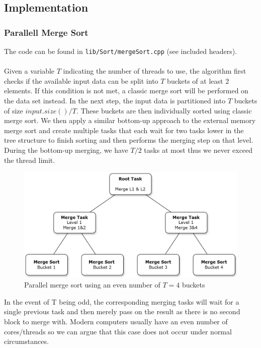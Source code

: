 \documentclass[twocolumn]{article}
\begin{document}
\subsection{Implementation}
\subsubsection{Parallell Merge Sort}
The code can be found in \texttt{lib/Sort/mergeSort.cpp} (see included headers).\\
\\
Given a variable $T$ indicating the number of threads to use, the algorithm first checks if the available input data can be split into $T$ buckets of at least $2$ elements. 
If this condition is not met, a classic merge sort will be performed on the data set instead.
In the next step, the input data is partitioned into $T$ buckets of size $input.size()/T$.  
These buckets are then individually sorted using classic merge sort. 
We then apply a similar bottom-up approach to the external memory merge sort and create multiple tasks that each wait for two tasks lower in the tree structure to finish sorting and then performs the merging step on that level. 
During the bottom-up merging, we have $T/2$ tasks at most thus we never exceed the thread limit.
\begin{figure}[h]
    \includegraphics[scale=0.175]{./figures/merge_sort_even.png}
    \centering
    \caption{Parallel merge sort using an even number of $T=4$ buckets}
    \end{figure}
In the event of T being odd, the corresponding merging tasks will wait for a single previous task and then merely pass on the result as there is no second block to merge with. 
Modern computers usually have an even number of cores/threads so we can argue that this case does not occur under normal circumstances.
\end{document}
